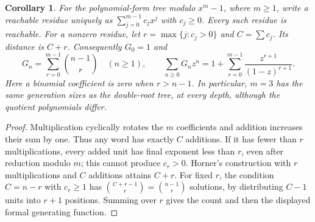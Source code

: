 \documentclass[11pt]{article}
\newtheorem{corollary}[theorem]{Corollary}
\begin{document}
\begin{corollary}\label{cor:cyclic}
For the polynomial-form tree modulo $x^m-1$, where $m\geq1$, write a
reachable residue uniquely as $\sum_{j=0}^{m-1}c_jx^j$ with $c_j\geq0$.
Every such residue is reachable. For a nonzero residue, let
$r=\max\{j:c_j>0\}$ and $C=\sum c_j$. Its distance is $C+r$.
Consequently $G_0=1$ and
\[
 G_n=\sum_{r=0}^{m-1}\binom{n-1}{r}\quad(n\geq1),\qquad
 \sum_{n\geq0}G_nz^n=1+\sum_{r=0}^{m-1}\frac{z^{r+1}}{(1-z)^{r+1}}.
\]
Here a binomial coefficient is zero when $r>n-1$.
In particular, $m=3$ has the same generation sizes as the double-root
tree, at every depth, although the quotient polynomials differ.
\end{corollary}
\begin{proof}
Multiplication cyclically rotates the $m$ coefficients and addition
increases their sum by one. Thus any word has exactly $C$ additions.
If it has fewer than $r$ multiplications, every added unit has final
exponent less than $r$, even after reduction modulo $m$; this cannot
produce $c_r>0$. Horner's construction with $r$ multiplications and
$C$ additions attains $C+r$. For fixed $r$, the condition $C=n-r$
with $c_r\geq1$ has $\binom{C+r-1}{r}=\binom{n-1}{r}$ solutions,
by distributing $C-1$ units into $r+1$ positions. Summing over $r$
gives the count and then the displayed formal generating function.
\end{proof}
\end{document}
